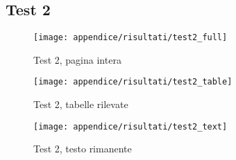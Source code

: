 \newpage
\subsection{Test 2}
\label{sec:bad-test}
\begin{figure}[H] 
    \centering
    \texttt{[image: appendice/risultati/test2\_full]} 
    \caption{Test 2, pagina intera}
    \label{img:test-0-full}
\end{figure} 
\newpage
\begin{figure}[H]  
        \centering  
        \texttt{[image: appendice/risultati/test2\_table]}  
        \caption{Test 2, tabelle rilevate}
\end{figure}
\begin{figure}[H]
        \centering  
        \texttt{[image: appendice/risultati/test2\_text]}  
        \caption{Test 2, testo rimanente}
\end{figure}%
